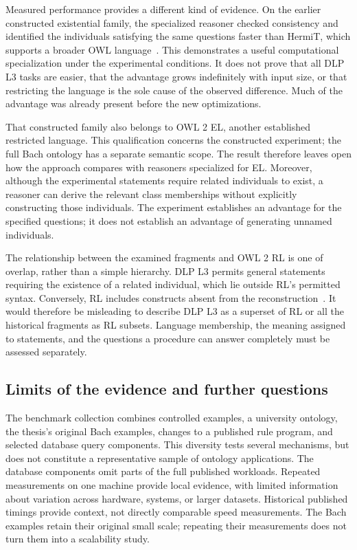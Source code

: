 Measured performance provides a different kind of evidence. On the earlier
constructed existential family, the specialized reasoner checked consistency and identified the
individuals satisfying the same questions faster than HermiT, which supports a broader OWL
language~\cite{glimm2014hermit}. This demonstrates a useful computational
specialization under the experimental conditions. It does not prove that all
DLP L3 tasks are easier, that the advantage grows indefinitely with input size,
or that restricting the language is the sole cause of the observed difference.
Much of the advantage was already present before the new optimizations.

That constructed family also belongs to OWL 2 EL, another established
restricted language. This qualification concerns the constructed experiment;
the full Bach ontology has a separate semantic scope. The result therefore leaves
open how the approach compares with reasoners specialized for EL. Moreover,
although the experimental statements require related individuals to exist,
a reasoner can derive the relevant class memberships without explicitly
constructing those individuals. The experiment establishes an advantage for the
specified questions; it does not establish an advantage of generating unnamed
individuals.

The relationship between the examined fragments and OWL 2 RL is one of
overlap, rather than a simple hierarchy. DLP L3 permits general statements
requiring the existence of a related individual, which lie outside RL's
permitted syntax. Conversely, RL includes constructs absent from the
reconstruction~\cite{owlprofiles2012}. It would therefore be misleading
to describe DLP L3 as a superset of RL or all the historical fragments as RL
subsets. Language membership, the meaning assigned to statements, and the
questions a procedure can answer completely must be assessed separately.

\subsection{Limits of the evidence and further questions}

The benchmark collection combines controlled examples, a university ontology,
the thesis's original Bach examples, changes to a published rule program,
and selected database query components.
This diversity tests several mechanisms, but does not constitute a
representative sample of ontology applications. The database components omit
parts of the full published workloads. Repeated measurements on one machine
provide local evidence, with limited information about variation across
hardware, systems, or larger datasets. Historical published timings provide
context, not directly comparable speed measurements.
The Bach examples retain their original small scale; repeating their
measurements does not turn them into a scalability study.

